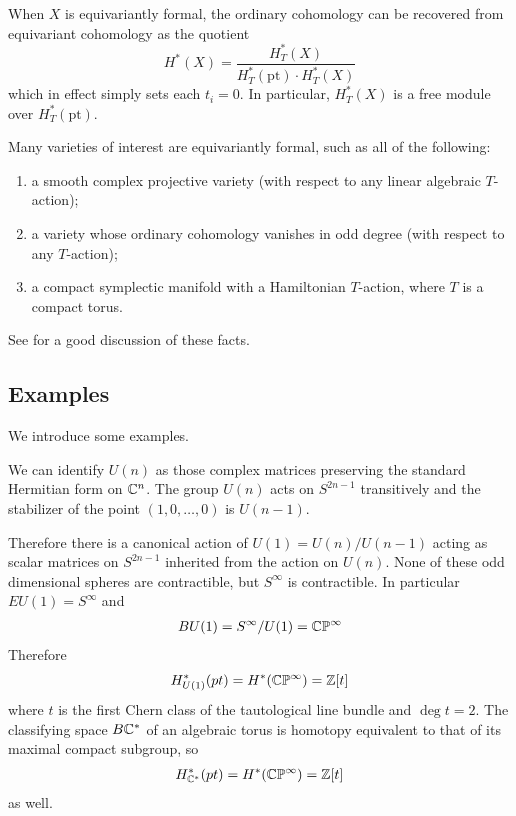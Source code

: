 When $X$ is equivariantly formal,
the ordinary cohomology can be recovered from
equivariant cohomology as the quotient
\[
	H^*(X) = \frac{H^*_T(X)}{H^*_T(\text{pt}) \cdot H^*_T(X)}
\]
which in effect simply sets each $t_i = 0$.
In particular, $H^*_T(X)$ is a free module over $H^*_T(\text{pt})$.

Many varieties of interest are equivariantly formal, such as all of the following:
\begin{enumerate}
	\item a smooth complex projective variety (with respect to any linear algebraic $T$-action);
	\item a variety whose ordinary cohomology vanishes in odd degree (with respect to any $T$-action);
	\item a compact symplectic manifold with a Hamiltonian $T$-action, where $T$ is a compact torus.
\end{enumerate}
See \cite{fulton-anderson} for a good discussion of these facts.

\subsection{Examples}
We introduce some examples.

\begin{example}
	We can identify $U(n)$ as those complex matrices preserving
	the standard Hermitian form on $\mathbb{C}^n$. The group $U(n)$ acts on $S^{2n-1}$ transitively and the stabilizer of the point $(1,0,\ldots,0)$ is $U(n-1)$.

	Therefore there is a canonical action of $U(1) = U(n)/U(n-1)$ acting as scalar matrices on $S^{2n-1}$ inherited from the action on $U(n)$. None of these odd dimensional spheres are contractible, but $S^\infty$ is contractible. In particular $EU(1) = S^\infty$ and \begin{align*}
		BU(1) = S^\infty/U(1) = \mathbb{C}\mathbb{P}^\infty
	\end{align*}
	Therefore \begin{align*}
		H^*_{U(1)}(pt) = H^*(\mathbb{C}\mathbb{P}^\infty) = \mathbb{Z}[t]
	\end{align*} where $t$ is the first Chern class of the tautological line bundle and $\deg t = 2$. The classifying space $B\mathbb{C}^*$ of an algebraic torus is
	homotopy equivalent to that of its maximal compact subgroup, so \begin{align*}
		H^*_{\mathbb{C}^*}(pt) = H^*(\mathbb{C}\mathbb{P}^\infty) = \mathbb{Z}[t]
	\end{align*} as well.
\end{example}

